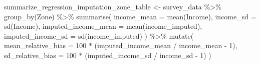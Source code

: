 \documentclass[
  spanish,
  11pt,
  letterpaper,
  oneside,
  open=any]{scrbook}
\newenvironment{Shaded}{\begin{snugshade}}{\end{snugshade}}
\newcommand{\AttributeTok}[1]{\textcolor[rgb]{0.40,0.45,0.13}{#1}}
\newcommand{\DecValTok}[1]{\textcolor[rgb]{0.68,0.00,0.00}{#1}}
\newcommand{\FunctionTok}[1]{\textcolor[rgb]{0.28,0.35,0.67}{#1}}
\newcommand{\NormalTok}[1]{\textcolor[rgb]{0.00,0.23,0.31}{#1}}
\newcommand{\OtherTok}[1]{\textcolor[rgb]{0.00,0.23,0.31}{#1}}
\newcommand{\SpecialCharTok}[1]{\textcolor[rgb]{0.37,0.37,0.37}{#1}}
\begin{document}
\begin{Shaded}
\begin{Highlighting}[]
\NormalTok{summarize\_regression\_imputation\_zone\_table }\OtherTok{\textless{}{-}}\NormalTok{ survey\_data }\SpecialCharTok{\%\textgreater{}\%}
  \FunctionTok{group\_by}\NormalTok{(Zone) }\SpecialCharTok{\%\textgreater{}\%}
  \FunctionTok{summarise}\NormalTok{(}
    \AttributeTok{income\_mean =} \FunctionTok{mean}\NormalTok{(Income),}
    \AttributeTok{income\_sd =} \FunctionTok{sd}\NormalTok{(Income),}
    \AttributeTok{imputed\_income\_mean =} \FunctionTok{mean}\NormalTok{(income\_imputed),}
    \AttributeTok{imputed\_income\_sd =} \FunctionTok{sd}\NormalTok{(income\_imputed)}
\NormalTok{  ) }\SpecialCharTok{\%\textgreater{}\%}
  \FunctionTok{mutate}\NormalTok{(}
    \AttributeTok{mean\_relative\_bias =} \DecValTok{100} \SpecialCharTok{*}\NormalTok{ (imputed\_income\_mean }\SpecialCharTok{/}\NormalTok{ income\_mean }\SpecialCharTok{{-}} \DecValTok{1}\NormalTok{),}
    \AttributeTok{sd\_relative\_bias =} \DecValTok{100} \SpecialCharTok{*}\NormalTok{ (imputed\_income\_sd }\SpecialCharTok{/}\NormalTok{ income\_sd }\SpecialCharTok{{-}} \DecValTok{1}\NormalTok{)}
\NormalTok{  )}
\end{Highlighting}
\end{Shaded}
\end{document}
